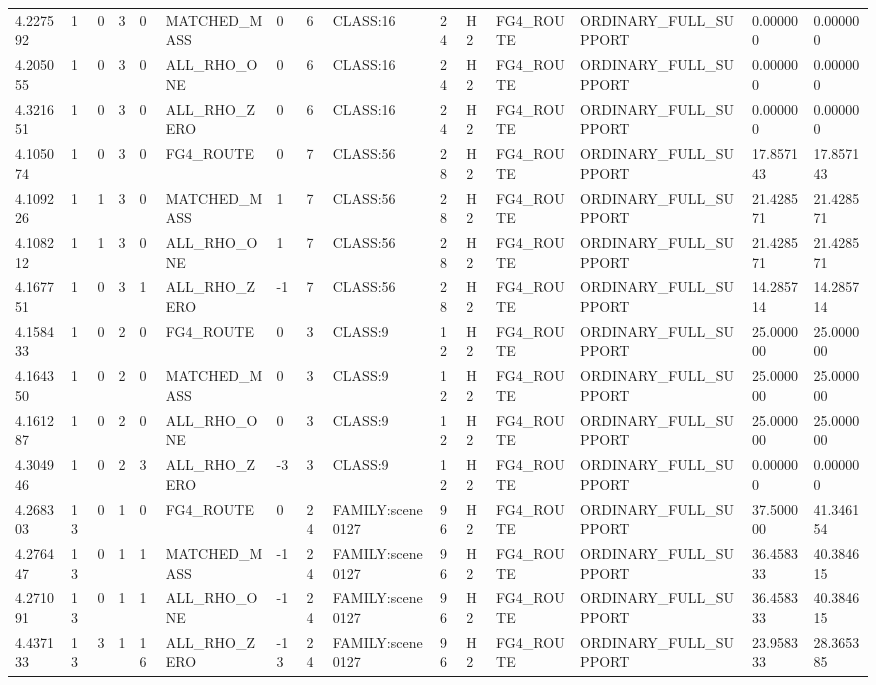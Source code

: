 \begin{tabular}{lllllllllllllll}
4.227592 & 1 & 0 & 3 & 0 & MATCHED\_MASS & 0 & 6 & CLASS:16 & 24 & H2 & FG4\_ROUTE & ORDINARY\_FULL\_SUPPORT & 0.000000 & 0.000000 \\
4.205055 & 1 & 0 & 3 & 0 & ALL\_RHO\_ONE & 0 & 6 & CLASS:16 & 24 & H2 & FG4\_ROUTE & ORDINARY\_FULL\_SUPPORT & 0.000000 & 0.000000 \\
4.321651 & 1 & 0 & 3 & 0 & ALL\_RHO\_ZERO & 0 & 6 & CLASS:16 & 24 & H2 & FG4\_ROUTE & ORDINARY\_FULL\_SUPPORT & 0.000000 & 0.000000 \\
4.105074 & 1 & 0 & 3 & 0 & FG4\_ROUTE & 0 & 7 & CLASS:56 & 28 & H2 & FG4\_ROUTE & ORDINARY\_FULL\_SUPPORT & 17.857143 & 17.857143 \\
4.109226 & 1 & 1 & 3 & 0 & MATCHED\_MASS & 1 & 7 & CLASS:56 & 28 & H2 & FG4\_ROUTE & ORDINARY\_FULL\_SUPPORT & 21.428571 & 21.428571 \\
4.108212 & 1 & 1 & 3 & 0 & ALL\_RHO\_ONE & 1 & 7 & CLASS:56 & 28 & H2 & FG4\_ROUTE & ORDINARY\_FULL\_SUPPORT & 21.428571 & 21.428571 \\
4.167751 & 1 & 0 & 3 & 1 & ALL\_RHO\_ZERO & -1 & 7 & CLASS:56 & 28 & H2 & FG4\_ROUTE & ORDINARY\_FULL\_SUPPORT & 14.285714 & 14.285714 \\
4.158433 & 1 & 0 & 2 & 0 & FG4\_ROUTE & 0 & 3 & CLASS:9 & 12 & H2 & FG4\_ROUTE & ORDINARY\_FULL\_SUPPORT & 25.000000 & 25.000000 \\
4.164350 & 1 & 0 & 2 & 0 & MATCHED\_MASS & 0 & 3 & CLASS:9 & 12 & H2 & FG4\_ROUTE & ORDINARY\_FULL\_SUPPORT & 25.000000 & 25.000000 \\
4.161287 & 1 & 0 & 2 & 0 & ALL\_RHO\_ONE & 0 & 3 & CLASS:9 & 12 & H2 & FG4\_ROUTE & ORDINARY\_FULL\_SUPPORT & 25.000000 & 25.000000 \\
4.304946 & 1 & 0 & 2 & 3 & ALL\_RHO\_ZERO & -3 & 3 & CLASS:9 & 12 & H2 & FG4\_ROUTE & ORDINARY\_FULL\_SUPPORT & 0.000000 & 0.000000 \\
4.268303 & 13 & 0 & 1 & 0 & FG4\_ROUTE & 0 & 24 & FAMILY:scene0127 & 96 & H2 & FG4\_ROUTE & ORDINARY\_FULL\_SUPPORT & 37.500000 & 41.346154 \\
4.276447 & 13 & 0 & 1 & 1 & MATCHED\_MASS & -1 & 24 & FAMILY:scene0127 & 96 & H2 & FG4\_ROUTE & ORDINARY\_FULL\_SUPPORT & 36.458333 & 40.384615 \\
4.271091 & 13 & 0 & 1 & 1 & ALL\_RHO\_ONE & -1 & 24 & FAMILY:scene0127 & 96 & H2 & FG4\_ROUTE & ORDINARY\_FULL\_SUPPORT & 36.458333 & 40.384615 \\
4.437133 & 13 & 3 & 1 & 16 & ALL\_RHO\_ZERO & -13 & 24 & FAMILY:scene0127 & 96 & H2 & FG4\_ROUTE & ORDINARY\_FULL\_SUPPORT & 23.958333 & 28.365385 \\

\end{tabular}
